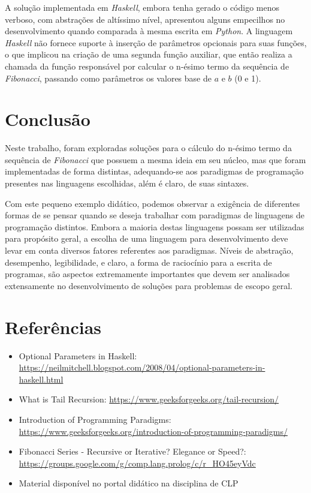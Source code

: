 \documentclass[a4paper, 12pt]{article}
\begin{document}
A solução implementada em \emph{Haskell}, embora tenha gerado o código menos verboso, com abstrações de altíssimo nível, apresentou alguns empecilhos no desenvolvimento quando comparada à mesma escrita em \emph{Python}. A linguagem \emph{Haskell} não fornece suporte à inserção de parâmetros opcionais para suas funções, o que implicou na criação de uma segunda função auxiliar, que então realiza a chamada da função responsável por calcular o n-ésimo termo da sequência de \emph{Fibonacci}, passando como parâmetros os valores base de \(a\) e \(b\) (0 e 1).

\section{Conclusão}

Neste trabalho, foram exploradas soluções para o cálculo do n-ésimo termo da sequência de \emph{Fibonacci} que possuem a mesma ideia em seu núcleo, mas que foram implementadas de forma distintas, adequando-se aos paradigmas de programação presentes nas linguagens escolhidas, além é claro, de suas sintaxes.

Com este pequeno exemplo didático, podemos observar a exigência de diferentes formas de se pensar quando se deseja trabalhar com paradigmas de linguagens de programação distintos. Embora a maioria destas linguagens possam ser utilizadas para propósito geral, a escolha de uma linguagem para desenvolvimento deve levar em conta diversos fatores referentes aos paradigmas. Níveis de abstração, desempenho, legibilidade, e claro, a forma de raciocínio para a escrita de programas, são aspectos extremamente importantes que devem ser analisados extensamente no desenvolvimento de soluções para problemas de escopo geral.

\section*{Referências}

\begin{itemize}
    \item Optional Parameters in Haskell: \url{https://neilmitchell.blogspot.com/2008/04/optional-parameters-in-haskell.html}
    \item What is Tail Recursion: \url{https://www.geeksforgeeks.org/tail-recursion/}
    \item Introduction of Programming Paradigms: \url{https://www.geeksforgeeks.org/introduction-of-programming-paradigms/}
    \item Fibonacci Series - Recursive or Iterative? Elegance or Speed?: \url{https://groups.google.com/g/comp.lang.prolog/c/r_HO45eyVdc}
    \item Material disponível no portal didático na disciplina de CLP
\end{itemize}
\end{document}

